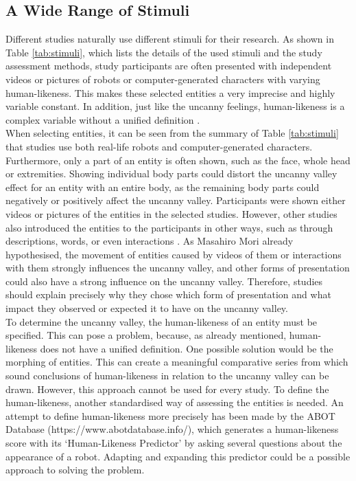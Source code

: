 \subsection{A Wide Range of Stimuli}
Different studies naturally use different stimuli for their research. As shown in Table \ref{tab:stimuli}, which lists the details of the used stimuli and the study assessment methods, study participants are often presented with independent videos or pictures of robots or computer-generated characters with varying human-likeness. This makes these selected entities a very imprecise and highly variable constant. In addition, just like the uncanny feelings, human-likeness is a complex variable without a unified definition \cite{quant_review}.\\
When selecting entities, it can be seen from the summary of Table \ref{tab:stimuli} that studies use both real-life robots and computer-generated characters. Furthermore, only a part of an entity is often shown, such as the face, whole head or extremities. Showing individual body parts could distort the uncanny valley effect for an entity with an entire body, as the remaining body parts could negatively or positively affect the uncanny valley. Participants were shown either videos or pictures of the entities in the selected studies. However, other studies also introduced the entities to the participants in other ways, such as through descriptions, words, or even interactions \cite{quant_review}. As Masahiro Mori \cite{original_masahiro} already hypothesised, the movement of entities caused by videos of them or interactions with them strongly influences the uncanny valley, and other forms of presentation could also have a strong influence on the uncanny valley. Therefore, studies should explain precisely why they chose which form of presentation and what impact they observed or expected it to have on the uncanny valley.\\
To determine the uncanny valley, the human-likeness of an entity must be specified. This can pose a problem, because, as already mentioned, human-likeness does not have a unified definition.
One possible solution would be the morphing of entities. This can create a meaningful comparative series from which sound conclusions of human-likeness in relation to the uncanny valley can be drawn. However, this approach cannot be used for every study.
To define the human-likeness, another standardised way of assessing the entities is needed.
An attempt to define human-likeness more precisely has been made by the ABOT Database (https://www.abotdatabase.info/), which generates a human-likeness score with its `Human-Likeness Predictor' by asking several questions about the appearance of a robot.
Adapting and expanding this predictor could be a possible approach to solving the problem.

